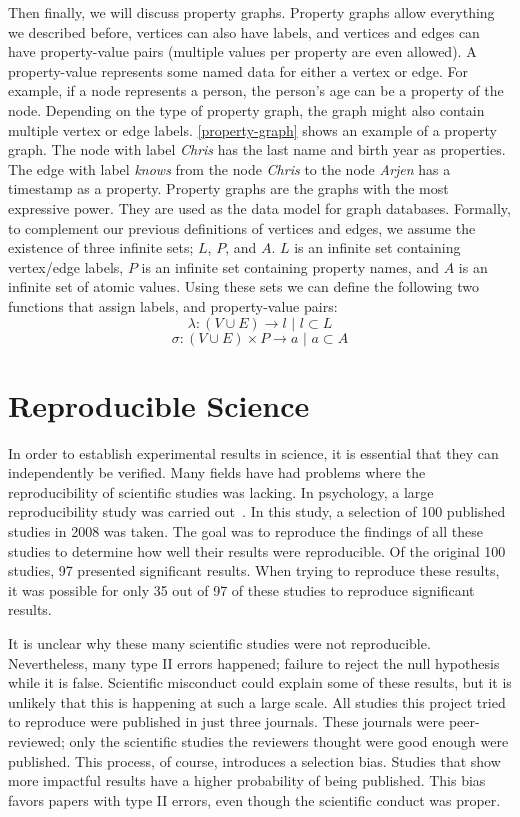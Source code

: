Then finally, we will discuss property graphs. Property graphs allow everything we described before, vertices can also have labels, and vertices and edges can have property-value pairs (multiple values per property are even allowed). A property-value represents some named data for either a vertex or edge. For example, if a node represents a person, the person's age can be a property of the node. Depending on the type of property graph, the graph might also contain multiple vertex or edge labels. \cref{property-graph} shows an example of a property graph. The node with label \emph{Chris} has the last name and birth year as properties. The edge with label \emph{knows} from the node \emph{Chris} to the node \emph{Arjen} has a timestamp as a property. Property graphs are the graphs with the most expressive power. They are used as the data model for graph databases. Formally, to complement our previous definitions of vertices and edges, we assume the existence of three infinite sets; $L$, $P$, and $A$. $L$ is an infinite set containing vertex/edge labels, $P$ is an infinite set containing property names, and $A$ is an infinite set of atomic values. Using these sets we can define the following two functions that assign labels, and property-value pairs:
\begin{equation}
	\lambda : \left(V \cup E\right) \rightarrow l \text{ | } l \subset L
\end{equation}
\begin{equation}
	\sigma : \left(V \cup E\right) \times P \rightarrow a \text{ | } a \subset A
\end{equation}

\section{Reproducible Science}
In order to establish experimental results in science, it is essential that they can independently be verified. Many fields have had problems where the reproducibility of scientific studies was lacking. In psychology, a large reproducibility study was carried out~\citep{psychology-reproduciblity}. In this study, a selection of 100 published studies in 2008 was taken. The goal was to reproduce the findings of all these studies to determine how well their results were reproducible. Of the original 100 studies, 97 presented significant results. When trying to reproduce these results, it was possible for only 35 out of 97 of these studies to reproduce significant results. 

It is unclear why these many scientific studies were not reproducible. Nevertheless, many type II errors happened; failure to reject the null hypothesis while it is false. Scientific misconduct could explain some of these results, but it is unlikely that this is happening at such a large scale. All studies this project tried to reproduce were published in just three journals. These journals were peer-reviewed; only the scientific studies the reviewers thought were good enough were published. This process, of course, introduces a selection bias. Studies that show more impactful results have a higher probability of being published. This bias favors papers with type II errors, even though the scientific conduct was proper. 

